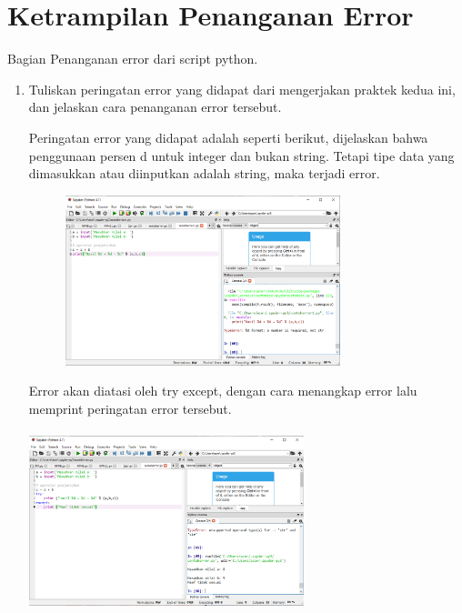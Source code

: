 \section{Ketrampilan Penanganan Error}
Bagian Penanganan error dari script python.
\begin{enumerate}
\item
Tuliskan peringatan error yang didapat dari mengerjakan praktek kedua ini, dan jelaskan cara penanganan error tersebut.
\par Peringatan error yang didapat adalah seperti berikut, dijelaskan bahwa penggunaan persen d untuk integer dan bukan string. Tetapi tipe data yang dimasukkan atau diinputkan adalah string, maka terjadi error.
\begin{figure}[h]
\centerline{\includegraphics[width=8cm]{figures/contoherror2.PNG}}
\end{figure}

\par Error akan diatasi oleh try except, dengan cara menangkap error lalu memprint peringatan error tersebut.
\paragraph{}
\centerline{\includegraphics[width=8cm]{figures/contoherror.PNG}}



\end{enumerate}
